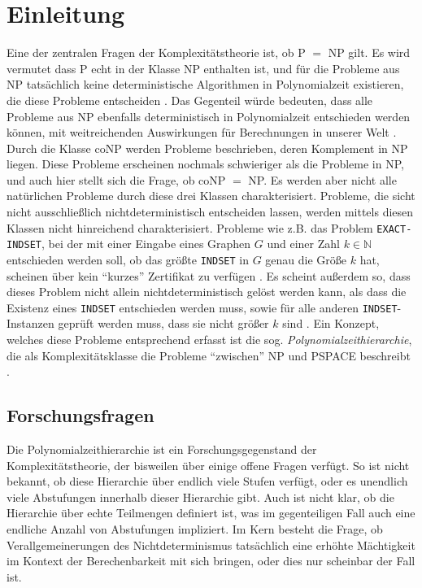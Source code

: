 \chapter{Einleitung}
Eine der zentralen Fragen der Komplexitätstheorie ist, ob P $=$ NP gilt.  Es wird vermutet dass P echt in der Klasse NP enthalten ist, und für die Probleme aus NP tatsächlich keine deterministische Algorithmen in Polynomialzeit existieren, die diese Probleme entscheiden \cite{sipser_introduction_2012}.
Das Gegenteil würde bedeuten, dass alle Probleme aus NP ebenfalls deterministisch in Polynomialzeit entschieden werden können, mit weitreichenden Auswirkungen für Berechnungen in unserer Welt \cite{arora_computational_2009}.
Durch die Klasse coNP werden Probleme beschrieben, deren Komplement in NP liegen. Diese Probleme erscheinen nochmals schwieriger als die Probleme in NP, und auch hier stellt sich die Frage, ob coNP $=$ NP.
Es werden aber nicht alle natürlichen Probleme durch diese drei Klassen charakterisiert. Probleme, die sicht nicht ausschließlich nichtdeterministisch entscheiden lassen, werden mittels diesen Klassen nicht hinreichend charakterisiert.
Probleme wie z.B. das Problem \texttt{EXACT-INDSET}, bei der mit einer Eingabe eines Graphen $G$ und einer Zahl $k \in \mathbb{N}$ entschieden werden soll, ob das größte \texttt{INDSET} in $G$ genau die Größe $k$ hat,
scheinen über kein \enquote{kurzes} Zertifikat zu verfügen \cite{arora_computational_2009}. Es scheint außerdem so, dass dieses Problem nicht allein nichtdeterministisch gelöst werden kann, als dass die Existenz eines \texttt{INDSET} entschieden werden muss, sowie für alle
anderen \texttt{INDSET}-Instanzen geprüft werden muss, dass sie nicht größer $k$ sind \cite{arora_computational_2009}. 
Ein Konzept, welches diese Probleme entsprechend erfasst ist die sog. \emph{Polynomialzeithierarchie}, die als Komplexitätsklasse die Probleme \enquote{zwischen} NP und PSPACE beschreibt \cite{arora_computational_2009}. 

\section{Forschungsfragen}
Die Polynomialzeithierarchie ist ein Forschungsgegenstand der Komplexitätstheorie, der bisweilen über einige offene Fragen verfügt. 
So ist nicht bekannt, ob diese Hierarchie über endlich viele Stufen verfügt, oder es unendlich viele Abstufungen innerhalb dieser Hierarchie gibt.
Auch ist nicht klar, ob die Hierarchie über echte Teilmengen definiert ist, was im gegenteiligen Fall auch eine endliche Anzahl von Abstufungen impliziert.
Im Kern besteht die Frage, ob Verallgemeinerungen des Nichtdeterminismus tatsächlich eine erhöhte Mächtigkeit im Kontext der Berechenbarkeit mit sich bringen, oder dies nur scheinbar der Fall ist.

